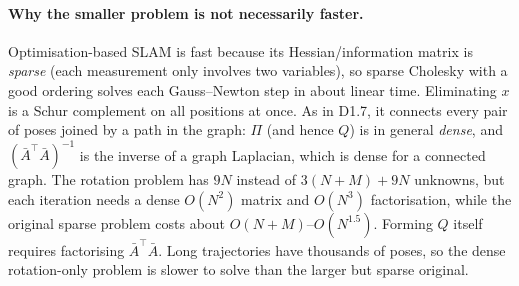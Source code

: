 \paragraph{Why the smaller problem is not necessarily faster.}
Optimisation-based SLAM is fast because its Hessian/information matrix is \emph{sparse}
(each measurement only involves two variables), so sparse Cholesky with a good ordering
solves each Gauss--Newton step in about linear time. Eliminating $x$ is a Schur complement
on all positions at once. As in D1.7, it connects every pair of poses joined by a path in
the graph: $\Pi$ (and hence $Q$) is in general \emph{dense}, and $(\bar A^\top\bar A)^{-1}$ is the
inverse of a graph Laplacian, which is dense for a connected graph. The rotation problem has
$9N$ instead of $3(N+M)+9N$ unknowns, but each iteration needs a dense $O(N^2)$ matrix and
$O(N^3)$ factorisation, while the original sparse problem costs about
$O(N+M)$--$O(N^{1.5})$. Forming $Q$ itself requires factorising $\bar A^\top\bar A$. Long
trajectories have thousands of poses, so the dense rotation-only problem is slower to solve
than the larger but sparse original.
